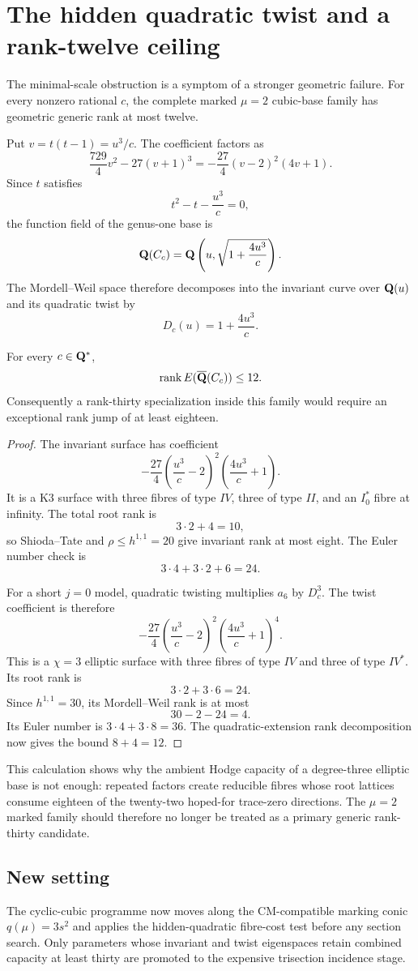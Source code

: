\section{The hidden quadratic twist and a rank-twelve ceiling}

The minimal-scale obstruction is a symptom of a stronger geometric failure.
For every nonzero rational $c$, the complete marked $\mu=2$ cubic-base family
has geometric generic rank at most twelve.

Put $v=t(t-1)=u^3/c$. The coefficient factors as
\[
\frac{729}{4}v^2-27(v+1)^3
=-\frac{27}{4}(v-2)^2(4v+1).
\]
Since $t$ satisfies
\[
t^2-t-\frac{u^3}{c}=0,
\]
the function field of the genus-one base is
\[
\mathbf Q(C_c)=\mathbf Q\left(u,\sqrt{1+\frac{4u^3}{c}}\right).
\]
The Mordell--Weil space therefore decomposes into the invariant curve over
$\mathbf Q(u)$ and its quadratic twist by
\[
D_c(u)=1+\frac{4u^3}{c}.
\]

\begin{theorem}
For every $c\in\mathbf Q^*$,
\[
\operatorname{rank} E(\overline{\mathbf Q}(C_c))\le12.
\]
Consequently a rank-thirty specialization inside this family would require an
exceptional rank jump of at least eighteen.
\end{theorem}

\begin{proof}
The invariant surface has coefficient
\[
-\frac{27}{4}
\left(\frac{u^3}{c}-2\right)^2
\left(\frac{4u^3}{c}+1\right).
\]
It is a K3 surface with three fibres of type $IV$, three of type $II$, and an
$I_0^*$ fibre at infinity. The total root rank is
\[
3\cdot2+4=10,
\]
so Shioda--Tate and $\rho\le h^{1,1}=20$ give invariant rank at most eight.
The Euler number check is
\[
3\cdot4+3\cdot2+6=24.
\]

For a short $j=0$ model, quadratic twisting multiplies $a_6$ by $D_c^3$.
The twist coefficient is therefore
\[
-\frac{27}{4}
\left(\frac{u^3}{c}-2\right)^2
\left(\frac{4u^3}{c}+1\right)^4.
\]
This is a $\chi=3$ elliptic surface with three fibres of type $IV$ and three
of type $IV^*$. Its root rank is
\[
3\cdot2+3\cdot6=24.
\]
Since $h^{1,1}=30$, its Mordell--Weil rank is at most
\[
30-2-24=4.
\]
Its Euler number is $3\cdot4+3\cdot8=36$. The quadratic-extension rank
decomposition now gives the bound $8+4=12$.
\end{proof}

This calculation shows why the ambient Hodge capacity of a degree-three
elliptic base is not enough: repeated factors create reducible fibres whose
root lattices consume eighteen of the twenty-two hoped-for trace-zero
directions. The $\mu=2$ marked family should therefore no longer be treated
as a primary generic rank-thirty candidate.

\subsection{New setting}

The cyclic-cubic programme now moves along the CM-compatible marking conic
$q(\mu)=3s^2$ and applies the hidden-quadratic fibre-cost test before any
section search. Only parameters whose invariant and twist eigenspaces retain
combined capacity at least thirty are promoted to the expensive trisection
incidence stage.
